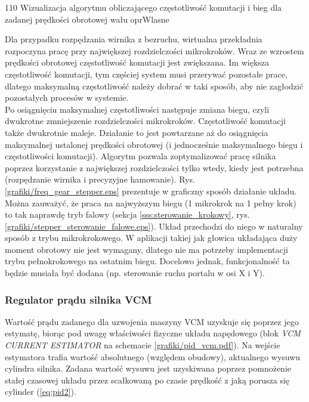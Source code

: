 	{110}
	{Wizualizacja algorytmu obliczającego częstotliwość komutacji i bieg dla zadanej prędkości obrotowej wału}
	{oprWlasne}

Dla przypadku rozpędzania wirnika z bezruchu, wirtualna przekładnia rozpoczyna pracę przy największej rozdzielczości mikrokroków. Wraz ze wzrostem prędkości obrotowej częstotliwość komutacji jest zwiększana. Im większa częstotliwość komutacji, tym częściej system musi przerywać pozostałe prace, dlatego maksymalną częstotliwość należy dobrać w taki sposób, aby nie zagłodzić pozostałych procesów w systemie. \\

Po osiągnięciu maksymalnej częstotliwości następuje zmiana biegu, czyli dwukrotne zmniejszenie rozdzielczości mikrokroków. Częstotliwość komutacji także dwukrotnie maleje. Działanie to jest powtarzane aż do osiągnięcia maksymalnej ustalonej prędkości obrotowej (i jednocześnie maksymalnego biegu i częstotliwości komutacji). Algorytm pozwala zoptymalizować pracę silnika poprzez korzystanie \linebreak z największej rozdzielczości tylko wtedy, kiedy jest potrzebna (rozpędzanie wirnika i precyzyjne hamowanie). Rys. \ref{grafiki/freq_gear_stepper.eps} prezentuje w graficzny sposób działanie układu. \\

Można zauważyć, że praca na najwyższym biegu (1 mikrokrok na 1 pełny krok) to tak naprawdę tryb falowy (sekcja \ref{sss:sterowanie_krokowy}, rys. \ref{grafiki/stepper_sterowanie_falowe.eps}). Układ przechodzi do niego w naturalny sposób z trybu mikrokrokowego. W aplikacji takiej jak głowica układająca duży moment obrotowy nie jest wymagany, dlatego nie ma potrzeby implementacji trybu pełnokrokowego na ostatnim biegu. Docelowo jednak, funkcjonalność ta będzie musiała być dodana (np. sterowanie ruchu portalu w osi X i Y).

\subsubsection{Regulator prądu silnika VCM}

Wartość prądu zadanego dla uzwojenia maszyny VCM uzyskuje się poprzez jego estymatę, biorąc pod uwagę właściwości fizyczne układu napędowego (blok {\it VCM CURRENT ESTIMATOR} na schemacie \ref{grafiki/pid_vcm.pdf}). Na wejście estymatora trafia wartość absolutnego (względem obudowy), aktualnego wysuwu cylindra silnika. Zadana wartość wysuwu jest uzyskiwana poprzez pomnożenie stałej czasowej układu przez scałkowaną po czasie prędkość z jaką porusza się cylinder (\ref{eq:pid2}).

